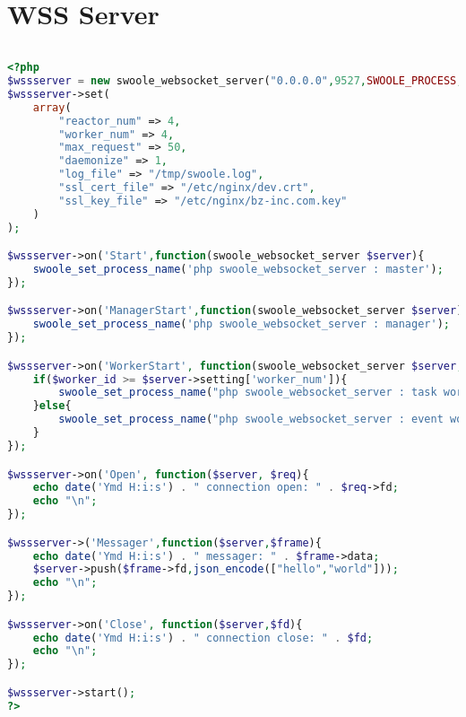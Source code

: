 \section{WSS Server}


\begin{lstlisting}[language=PHP]

\end{lstlisting}





\begin{lstlisting}[language=PHP]
<?php
$wssserver = new swoole_websocket_server("0.0.0.0",9527,SWOOLE_PROCESS,SWOOLE_SOCK_TCP|SWOOLE_SSL);
$wssserver->set(
	array(
		"reactor_num" => 4,
		"worker_num" => 4,
		"max_request" => 50,
		"daemonize" => 1,
		"log_file" => "/tmp/swoole.log",
		"ssl_cert_file" => "/etc/nginx/dev.crt",
		"ssl_key_file" => "/etc/nginx/bz-inc.com.key"
	)
);

$wssserver->on('Start',function(swoole_websocket_server $server){
	swoole_set_process_name('php swoole_websocket_server : master');
});

$wssserver->on('ManagerStart',function(swoole_websocket_server $server){
	swoole_set_process_name('php swoole_websocket_server : manager');
});

$wssserver->on('WorkerStart', function(swoole_websocket_server $server, $worker_id){
	if($worker_id >= $server->setting['worker_num']){
		swoole_set_process_name("php swoole_websocket_server : task worker " . $worker_id);
	}else{
		swoole_set_process_name("php swoole_websocket_server : event worker " . $worker_id);
	}
});

$wssserver->on('Open', function($server, $req){
	echo date('Ymd H:i:s') . " connection open: " . $req->fd;
	echo "\n";
});

$wssserver->('Messager',function($server,$frame){
	echo date('Ymd H:i:s') . " messager: " . $frame->data;
	$server->push($frame->fd,json_encode(["hello","world"]));
	echo "\n";
});

$wssserver->on('Close', function($server,$fd){
	echo date('Ymd H:i:s') . " connection close: " . $fd;
	echo "\n";
});

$wssserver->start();
?>
\end{lstlisting}




\begin{lstlisting}[language=PHP]

\end{lstlisting}




